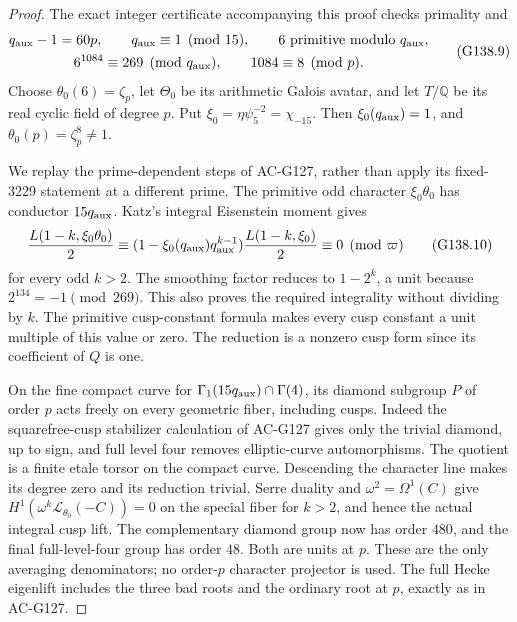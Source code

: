 \begin{proof}
The exact integer certificate accompanying this proof checks
primality and
\[
 \begin{gathered}
 q_{\rm aux}-1=60p,\qquad q_{\rm aux}\equiv1\pmod{15},\qquad
 6\text{ primitive modulo }q_{\rm aux},\\
 6^{1084}\equiv269\pmod{q_{\rm aux}},\qquad1084\equiv8\pmod p.
 \end{gathered}
 \tag{G138.9}
\]
Choose \(\theta_0(6)=\zeta_p\), let \(\Theta_0\) be its
arithmetic Galois avatar, and let \(T/\mathbb Q\) be its real
cyclic field of degree \(p\).  Put \(\xi_0=\eta\psi_5^{-2}
=\chi_{-15}\).  Then \(\xi_0(q_{\rm aux})=1\), and
\(\theta_0(p)=\zeta_p^8\ne1\).

We replay the prime-dependent steps of AC-G127, rather than
apply its fixed-3229 statement at a different prime.
The primitive odd character \(\xi_0\theta_0\) has conductor
\(15q_{\rm aux}\).  Katz's integral Eisenstein moment gives
\[
 \frac{L(1-k,\xi_0\theta_0)}2
 \equiv(1-\xi_0(q_{\rm aux})q_{\rm aux}^{k-1})
             \frac{L(1-k,\xi_0)}2\equiv0\pmod\varpi
 \tag{G138.10}
\]
for every odd \(k>2\).  The smoothing factor reduces to
\(1-2^k\), a unit because \(2^{134}=-1\pmod{269}\).
This also proves the required integrality without dividing by
\(k\).  The primitive cusp-constant formula makes every cusp
constant a unit multiple of this value or zero.  The reduction
is a nonzero cusp form since its coefficient of \(Q\) is one.

On the fine compact curve for
\(\Gamma_1(15q_{\rm aux})\cap\Gamma(4)\), its diamond
subgroup \(P\) of order \(p\) acts freely on every geometric
fiber, including cusps.  Indeed the squarefree-cusp stabilizer
calculation of AC-G127 gives only the trivial diamond, up to
sign, and full level four removes elliptic-curve automorphisms.
The quotient is a finite etale torsor on the compact curve.
Descending the character line makes its degree zero and its
reduction trivial.  Serre duality and
\(\omega^2=\Omega^1(C)\) give
\(H^1(\omega^k\mathcal L_{\theta_0}(-C))=0\) on the
special fiber for \(k>2\), and hence the actual integral cusp
lift.  The complementary diamond group now has order \(480\),
and the final full-level-four group has order \(48\).
Both are units at \(p\).  These are the only averaging
denominators; no order-\(p\) character projector is used.
The full Hecke eigenlift includes the three bad roots and the
ordinary root at \(p\), exactly as in AC-G127.


\end{proof}
